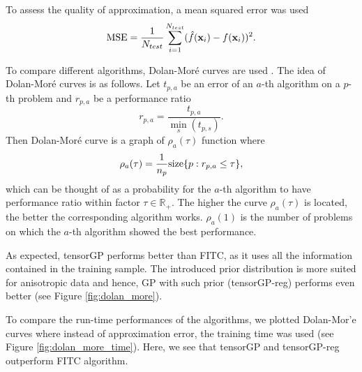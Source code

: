 To assess the quality of approximation, a mean squared error was used
\begin{equation}
  \label{eq:mse}
  {\rm MSE} = \frac{1}{N_{test}} \sum_{i = 1}^{N_{test}} (\hat{f}(\mathbf{x}_i) - f(\mathbf{x}_i))^2.
\end{equation}

To compare different algorithms, Dolan-Mor\'{e} curves are used \citep{dolanMore}.
The idea of Dolan-Mor\'{e} curves is as follows.
Let $t_{p, a}$ be an error of an $a$-th algorithm on a $p$-th problem and $r_{p, a}$
be a performance ratio
\[
r_{p, a} = \frac{t_{p, a}} {\min\limits_s(t_{p, s})}.
\]
Then Dolan-Mor\'{e} curve is a graph of $\rho_a(\tau)$ function where
\[
\rho_a(\tau) = \frac{1}{n_p}{\rm size} \{p: r_{p, a} \le \tau \},
\]
which can be thought of as a probability for the  $a$-th algorithm to have performance
ratio within factor $\tau \in \mathbb{R}_+$.
The higher the curve $\rho_a(\tau)$ is located, the better the corresponding algorithm works.
$\rho_a(1)$ is the number of problems on which the $a$-th algorithm showed the best performance.

As expected, tensorGP performs better than FITC, as it uses all the information
contained in the training sample.
The introduced prior distribution is more suited for anisotropic data and hence,
GP with such prior (tensorGP-reg) performs even better (see Figure \ref{fig:dolan_more}).

To compare the run-time performances of the algorithms, we plotted Dolan-Mor{'e} curves
where instead of approximation error, the training time was used (see Figure \ref{fig:dolan_more_time}).
Here, we see that tensorGP and tensorGP-reg outperform FITC algorithm.

